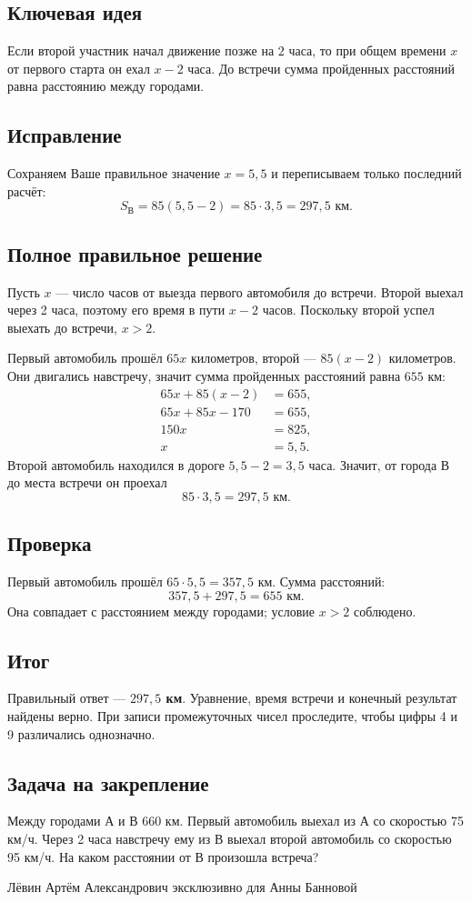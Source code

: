 \documentclass[a4paper,12pt]{article}
\begin{document}
\subsection*{\textcolor{accent}{Ключевая идея}}
Если второй участник начал движение позже на $2$ часа, то при общем времени $x$ от первого старта он ехал $x-2$ часа. До встречи сумма пройденных расстояний равна расстоянию между городами.

\subsection*{Исправление}
Сохраняем Ваше правильное значение $x=5{,}5$ и переписываем только последний расчёт:
\[
S_{\text{В}}=85(5{,}5-2)=85\cdot3{,}5=297{,}5\text{ км}.
\]

\subsection*{Полное правильное решение}
Пусть $x$ --- число часов от выезда первого автомобиля до встречи. Второй выехал через 2 часа, поэтому его время в пути $x-2$ часов. Поскольку второй успел выехать до встречи, $x>2$.

Первый автомобиль прошёл $65x$ километров, второй --- $85(x-2)$ километров. Они двигались навстречу, значит сумма пройденных расстояний равна $655$ км:
\[
\begin{aligned}
65x+85(x-2)&=655,\\
65x+85x-170&=655,\\
150x&=825,\\
x&=5{,}5.
\end{aligned}
\]
Второй автомобиль находился в дороге $5{,}5-2=3{,}5$ часа. Значит, от города В до места встречи он проехал
\[
85\cdot3{,}5=297{,}5\text{ км}.
\]

\subsection*{Проверка}
Первый автомобиль прошёл $65\cdot5{,}5=357{,}5$ км. Сумма расстояний:
\[
357{,}5+297{,}5=655\text{ км}.
\]
Она совпадает с расстоянием между городами; условие $x>2$ соблюдено.

\subsection*{\textcolor{accent}{Итог}}
Правильный ответ --- \textbf{$297{,}5$ км}. Уравнение, время встречи и конечный результат найдены верно. При записи промежуточных чисел проследите, чтобы цифры 4 и 9 различались однозначно.

\subsection*{Задача на закрепление}
Между городами А и В 660 км. Первый автомобиль выехал из А со скоростью 75 км/ч. Через 2 часа навстречу ему из В выехал второй автомобиль со скоростью 95 км/ч. На каком расстоянии от В произошла встреча?

\vfill
\begin{center}\small\color{muted}Лёвин Артём Александрович эксклюзивно для Анны Банновой\end{center}
\end{document}
